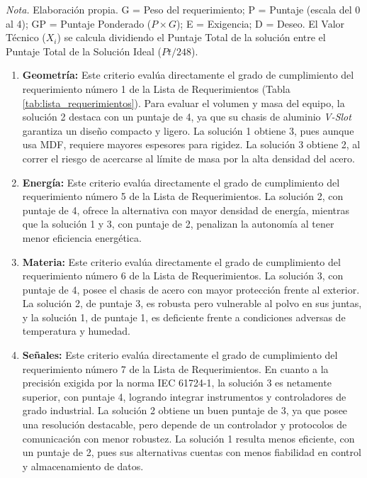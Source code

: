 \begin{table}[H]
	\raggedright
	\scriptsize \textit{Nota.} Elaboración propia. G = Peso del requerimiento; P = Puntaje (escala del 0 al 4); GP = Puntaje Ponderado ($P \times G$); E = Exigencia; D = Deseo. El Valor Técnico ($X_i$) se calcula dividiendo el Puntaje Total de la solución entre el Puntaje Total de la Solución Ideal ($Pt / 248$).
	\label{tab:evaluacion_tecnica}
\end{table}
%

\begin{enumerate}
	\item \textbf{Geometría:} Este criterio evalúa directamente el grado de cumplimiento del requerimiento número 1 de la Lista de Requerimientos (Tabla  \ref{tab:lista_requerimientos}). 
	Para evaluar el volumen y masa del equipo, la solución 2 destaca con un puntaje de 4, ya que su chasis de aluminio \textit{V-Slot} garantiza un diseño compacto y ligero. La solución 1 obtiene 3, pues aunque usa MDF, requiere mayores espesores para rigidez. La solución 3 obtiene 2, al correr el riesgo de acercarse al límite de masa por la alta densidad del acero.
	\item \textbf{Energía:} Este criterio evalúa directamente el grado de cumplimiento del requerimiento número 5 de la Lista de Requerimientos.
	La solución 2, con puntaje de 4, ofrece la alternativa con mayor densidad de energía, mientras que la solución 1 y 3, con puntaje de 2, penalizan la autonomía al tener menor eficiencia energética.
	\item \textbf{Materia:} Este criterio evalúa directamente el grado de cumplimiento del requerimiento número 6 de la Lista de Requerimientos.
	La solución 3, con puntaje de 4, posee el chasis de acero con mayor protección frente al exterior. La solución 2, de puntaje 3, es robusta pero vulnerable al polvo en sus juntas, y la solución 1, de puntaje 1, es deficiente frente a condiciones adversas de temperatura y humedad.
	\item \textbf{Señales:} Este criterio evalúa directamente el grado de cumplimiento del requerimiento número 7 de la Lista de Requerimientos.
	En cuanto a la precisión exigida por la norma IEC 61724-1, la solución 3 es netamente superior, con puntaje 4, logrando integrar instrumentos y controladores de grado industrial. La solución 2 obtiene un buen puntaje de 3, ya que posee una resolución destacable, pero depende de un controlador y protocolos de comunicación con menor robustez. La solución 1 resulta menos eficiente, con un puntaje de 2, pues sus alternativas cuentas con menos fiabilidad en control y almacenamiento de datos.

\end{enumerate}
